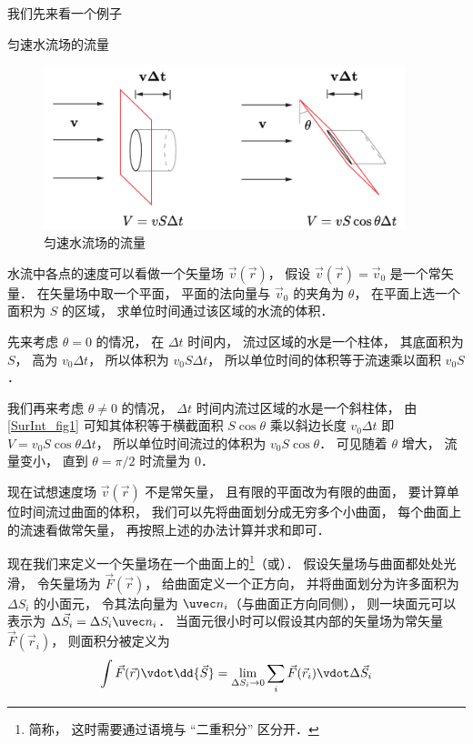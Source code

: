 

我们先来看一个例子

\begin{exam}{匀速水流场的流量}

\begin{figure}[ht]
\centering
\includegraphics[width=10.5cm]{./figures/SurInt1.pdf}
\caption{匀速水流场的流量} \label{SurInt_fig1}
\end{figure}

水流中各点的速度可以看做一个矢量场 $\vec v(\vec r)$， 假设 $\vec v(\vec r) = \vec v_0$ 是一个常矢量． 在矢量场中取一个平面， 平面的法向量与 $\vec v_0$ 的夹角为 $\theta$， 在平面上选一个面积为 $S$ 的区域， 求单位时间通过该区域的水流的体积．

先来考虑 $\theta = 0$ 的情况， 在 $\Delta t$ 时间内， 流过区域的水是一个柱体， 其底面积为 $S$， 高为 $v_0\Delta t$， 所以体积为 $v_0 S\Delta t$， 所以单位时间的体积等于流速乘以面积 $v_0 S$．

我们再来考虑 $\theta \ne 0$ 的情况， $\Delta t$ 时间内流过区域的水是一个斜柱体， 由\autoref{SurInt_fig1} 可知其体积等于横截面积 $S\cos\theta$ 乘以斜边长度 $v_0\Delta t$ 即 $V = v_0 S\cos\theta\Delta t$， 所以单位时间流过的体积为 $v_0 S\cos\theta$． 可见随着 $\theta$ 增大， 流量变小， 直到 $\theta = \pi/2$ 时流量为 $0$．

现在试想速度场 $\vec v(\vec r)$ 不是常矢量， 且有限的平面改为有限的曲面， 要计算单位时间流过曲面的体积， 我们可以先将曲面划分成无穷多个小曲面， 每个曲面上的流速看做常矢量， 再按照上述的办法计算并求和即可．
\end{exam}

现在我们来定义一个矢量场在一个曲面上的\footnote{简称， 这时需要通过语境与 “二重积分” 区分开．}（或）． 假设矢量场与曲面都处处光滑， 令矢量场为 $\vec F(\vec r)$， 给曲面定义一个正方向， 并将曲面划分为许多面积为 $\Delta S_i$ 的小面元， 令其法向量为 $\uvec n_i$（与曲面正方向同侧）， 则一块面元可以表示为 $\Delta \vec S_i = \Delta S_i \uvec n_i$． 当面元很小时可以假设其内部的矢量场为常矢量 $\vec F(\vec r_i)$， 则面积分被定义为
\begin{equation}\label{SurInt_eq1}
\int \vec F(\vec r) \vdot \dd{\vec S} = \lim_{\Delta S_i\to 0} \sum_i \vec F(\vec r_i) \vdot \Delta \vec S_i
\end{equation}

